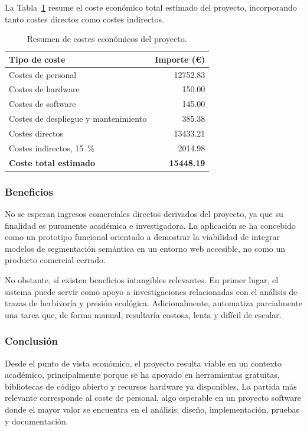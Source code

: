 La Tabla~\ref{tab:costes_totales} resume el coste económico total estimado del proyecto, incorporando tanto costes directos como costes indirectos.

\begin{table}[]
	\centering
	\renewcommand{\arraystretch}{1.25}
	\begin{tabular}{l r}
		\toprule
		\textbf{Tipo de coste} & \textbf{Importe (€)} \\
		\midrule
		Costes de personal & \num{12752.83} \\
		Costes de hardware & \num{150.00} \\
		Costes de software & \num{145.00} \\
		Costes de despliegue y mantenimiento & \num{385.38} \\
		\midrule
		Costes directos & \num{13433.21} \\
		Costes indirectos, \qty{15}{\percent} & \num{2014.98} \\
		\midrule
		\textbf{Coste total estimado} & \textbf{\num{15448.19}} \\
		\bottomrule
	\end{tabular}
	\caption{Resumen de costes económicos del proyecto.}
	\label{tab:costes_totales}
\end{table}

\subsubsection{Beneficios}

No se esperan ingresos comerciales directos derivados del proyecto, ya que su finalidad es puramente académica e investigadora. La aplicación se ha concebido como un prototipo funcional orientado a demostrar la viabilidad de integrar modelos de segmentación semántica en un entorno web accesible, no como un producto comercial cerrado.

No obstante, sí existen beneficios intangibles relevantes. En primer lugar, el sistema puede servir como apoyo a investigaciones relacionadas con el análisis de trazas de herbivoría y presión ecológica. Adicionalmente, automatiza parcialmente una tarea que, de forma manual, resultaría costosa, lenta y difícil de escalar.

\subsubsection{Conclusión}

Desde el punto de vista económico, el proyecto resulta viable en un contexto académico, principalmente porque se ha apoyado en herramientas gratuitas, bibliotecas de código abierto y recursos hardware ya disponibles. La partida más relevante corresponde al coste de personal, algo esperable en un proyecto software donde el mayor valor se encuentra en el análisis, diseño, implementación, pruebas y documentación.

